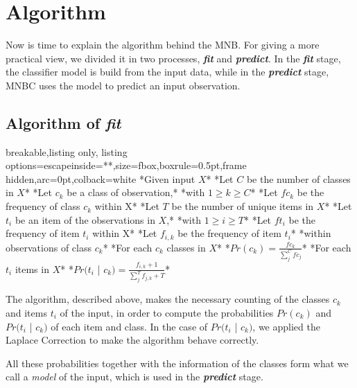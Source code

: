\section{Algorithm}
\label{sec:algorithm}
Now is time to explain the algorithm behind the MNB. For giving a more practical view, we divided it in two processes, \textbf{\textit{fit}} and \textbf{\textit{predict}}. In the \textbf{\textit{fit}} stage, the classifier model is build from the input data, while in the \textbf{\textit{predict}} stage, MNBC uses the model to predict an input observation.

\subsection{Algorithm of \textit{fit}}

\begin{tcblisting}{breakable,listing only,
    listing options={escapeinside={*}{*}},size=fbox,boxrule=0.5pt,frame hidden,arc=0pt,colback=white}
*Given input $X$*
    *Let $C$ be the number of classes in $X$*
    *Let $c_k$ be a class of observation,*
        *with $1 \geq k \geq C$*
    *Let $fc_k$ be the frequency of class $c_k$ within X*
    *Let $T$ be the number of unique items in $X$*
    *Let $t_i$ be an item of the observations in $X$,*
        *with $1 \geq i \geq T$*
    *Let $ft_i$ be the frequency of item $t_i$ within X*
    *Let $f_{i,k}$ be the frequency of item $t_i$* 
        *within observations of class $c_k$*
    *For each $c_k$ classes in $X$*
        *$Pr(c_k) = \frac{fc_k}{\sum_j^C{fc_j}}$*
        *For each $t_i$ items in $X$*
            *$Pr(t_i$ | $c_k) = \frac{f_{i,k} + 1}{\sum_j^T{f_{j,k}} + T}$*
\end{tcblisting}

The algorithm, described above, makes the necessary counting of the classes $c_k$ and items $t_i$ of the input, in order to compute the probabilities $Pr(c_k)$ and $Pr(t_i$ | $c_k)$ of each item and class. In the case of $Pr(t_i$ | $c_k)$, we applied the Laplace Correction to make the algorithm behave correctly.

All these probabilities together with the information of the classes form what we call a \textit{model} of the input, which is used in the \textbf{\textit{predict}} stage.

